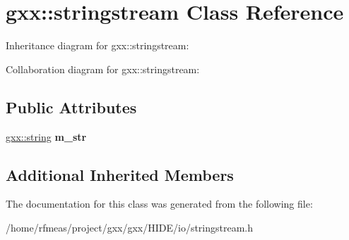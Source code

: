 \hypertarget{classgxx_1_1stringstream}{}\section{gxx\+:\+:stringstream Class Reference}
\label{classgxx_1_1stringstream}


Inheritance diagram for gxx\+:\+:stringstream\+:


Collaboration diagram for gxx\+:\+:stringstream\+:
\subsection*{Public Attributes}
\begin{DoxyCompactItemize}
\item 
\hyperlink{classgxx_1_1basic__string}{gxx\+::string} {\bfseries m\+\_\+str}\hypertarget{classgxx_1_1stringstream_a0a4e2d23fbe4ff244e519c87dd54a571}{}\label{classgxx_1_1stringstream_a0a4e2d23fbe4ff244e519c87dd54a571}

\end{DoxyCompactItemize}
\subsection*{Additional Inherited Members}


The documentation for this class was generated from the following file\+:\begin{DoxyCompactItemize}
\item 
/home/rfmeas/project/gxx/gxx/\+H\+I\+D\+E/io/stringstream.\+h\end{DoxyCompactItemize}
